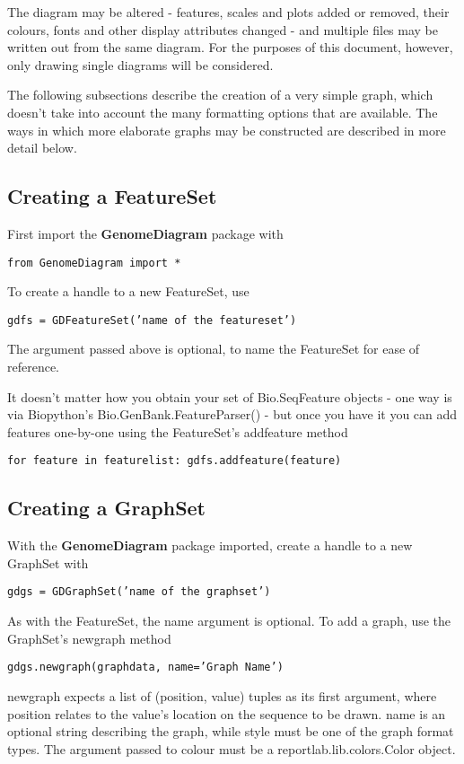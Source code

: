 \documentclass{article}
\begin{document}
The diagram may be altered - features, scales and plots added or
removed, their colours, fonts and other display attributes changed
- and multiple files may be written out from the same diagram. For
the purposes of this document, however, only drawing single
diagrams will be considered.

The following subsections describe the creation of a very simple graph, 
which doesn't take into account the many formatting options that are 
available.  The ways in which more elaborate graphs may be constructed are
described in more detail below.

\subsection{Creating a FeatureSet}
First import the \textbf{GenomeDiagram} package with

\texttt{from GenomeDiagram import *}

To create a handle to a new FeatureSet, use

\texttt{gdfs = GDFeatureSet('name of the featureset')}

The argument passed above is optional, to name the FeatureSet for ease of 
reference.

It doesn't matter how you obtain your set of Bio.SeqFeature objects - one 
way is via Biopython's Bio.GenBank.FeatureParser() - but once you have it 
you can add features one-by-one using the FeatureSet's add\us feature 
method

\texttt{for feature in feature\us list: gdfs.add\us feature(feature)}


\subsection{Creating a GraphSet}
With the \textbf{GenomeDiagram} package imported, create a handle to a new 
GraphSet with 

\texttt{gdgs = GDGraphSet('name of the graphset')}

As with the FeatureSet, the name argument is optional.  To add a graph, use 
the GraphSet's new\us graph method

\texttt{gdgs.new\us graph(graphdata, name='Graph Name')}

new\us graph expects a list of (position, value) tuples as its first argument, 
where position relates to the value's location on the sequence to be drawn.  
name is an optional string describing the graph, while style must be one 
of the graph format types.  The argument passed to colour must be a 
reportlab.lib.colors.Color object.
\end{document}
